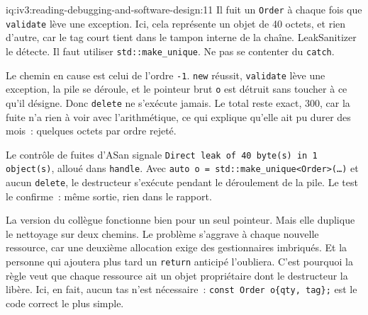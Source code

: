 \begin{solution}{iq:iv3:reading-debugging-and-software-design:11}
Il fuit un \texttt{Order} à chaque fois que \texttt{validate} lève une exception. Ici, cela représente un objet de 40 octets, et rien d'autre, car le tag court tient dans le tampon interne de la chaîne. LeakSanitizer le détecte. Il faut utiliser \texttt{std::make\_unique}. Ne pas se contenter du \texttt{catch}.

Le chemin en cause est celui de l'ordre \texttt{-1}. \texttt{new} réussit, \texttt{validate} lève une exception, la pile se déroule, et le pointeur brut \texttt{o} est détruit sans toucher à ce qu'il désigne. Donc \texttt{delete} ne s'exécute jamais. Le total reste exact, 300, car la fuite n'a rien à voir avec l'arithmétique, ce qui explique qu'elle ait pu durer des mois~: quelques octets par ordre rejeté.

Le contrôle de fuites d'ASan signale \texttt{Direct leak of 40 byte(s) in 1 object(s)}, alloué dans \texttt{handle}. Avec \texttt{auto o = std::make\_unique<Order>(\dots)} et aucun \texttt{delete}, le destructeur s'exécute pendant le déroulement de la pile. Le test le confirme~: même sortie, rien dans le rapport.

La version du collègue fonctionne bien pour un seul pointeur. Mais elle duplique le nettoyage sur deux chemins. Le problème s'aggrave à chaque nouvelle ressource, car une deuxième allocation exige des gestionnaires imbriqués. Et la personne qui ajoutera plus tard un \texttt{return} anticipé l'oubliera. C'est pourquoi la règle veut que chaque ressource ait un objet propriétaire dont le destructeur la libère. Ici, en fait, aucun tas n'est nécessaire~: \texttt{const Order o\{qty, \textquotedbl{}tag\textquotedbl{}\};} est le code correct le plus simple.


\end{solution}

